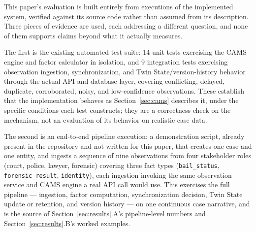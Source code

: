 \documentclass[conference]{IEEEtran}
\begin{document}
This paper's evaluation is built entirely from executions of the
implemented system, verified against its source code rather than assumed
from its description. Three pieces of evidence are used, each addressing a
different question, and none of them supports claims beyond what it
actually measures.

The first is the existing automated test suite: 14 unit tests exercising
the CAMS engine and factor calculator in isolation, and 9 integration tests
exercising observation ingestion, synchronization, and Twin
State/version-history behavior through the actual API and database layer,
covering conflicting, delayed, duplicate, corroborated, noisy, and
low-confidence observations. These establish that the implementation
behaves as Section~\ref{sec:cams} describes it, under the specific
conditions each test constructs; they are a correctness check on the
mechanism, not an evaluation of its behavior on realistic case data.

The second is an end-to-end pipeline execution: a demonstration script,
already present in the repository and not written for this paper, that
creates one case and one entity, and ingests a sequence of nine
observations from four stakeholder roles (court, police, lawyer, forensic)
covering three fact types (\texttt{bail\_status}, \texttt{forensic\_result},
\texttt{identity}), each ingestion invoking the same observation service
and CAMS engine a real API call would use. This exercises the full
pipeline --- ingestion, factor computation, synchronization decision, Twin
State update or retention, and version history --- on one continuous case
narrative, and is the source of Section~\ref{sec:results}.A's pipeline-level
numbers and Section~\ref{sec:results}.B's worked examples.
\end{document}
